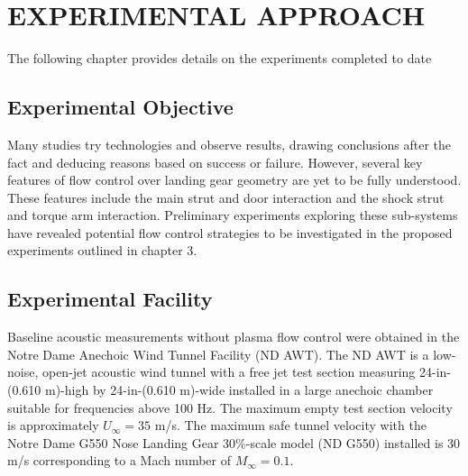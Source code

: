 %
%
%
%
%
%
%
%
%
%


%
%

\chapter{EXPERIMENTAL APPROACH}
The following chapter provides details on the experiments completed to date

\section{Experimental Objective}
Many studies try technologies and observe results, drawing conclusions after the fact and deducing reasons based on success or failure.
However, several key features of flow control over landing gear geometry are yet to be fully understood. These features include the main strut and door interaction and the shock strut and torque arm interaction. Preliminary experiments exploring these sub-systems have revealed potential flow control strategies to be investigated in the proposed experiments outlined in chapter 3.


\section{Experimental Facility}
Baseline acoustic measurements without plasma flow control were obtained in the Notre Dame Anechoic Wind Tunnel Facility (ND AWT). The ND AWT is a low-noise, open-jet acoustic wind tunnel with a free jet test section measuring 24-in-(0.610 m)-high by 24-in-(0.610 m)-wide installed in a large anechoic chamber suitable for frequencies above 100 Hz. The maximum empty test section velocity is approximately $U_\infty = 35$ m/s. The maximum safe tunnel velocity with the Notre Dame G550 Nose Landing Gear 30\%-scale model (ND G550) installed is  30 m/s corresponding to a Mach number of $M_\infty=0.1$.

